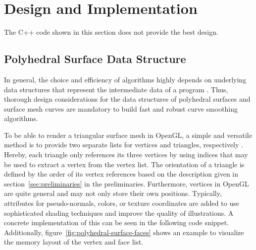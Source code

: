 \documentclass{stdlocal}
\begin{document}
\section{Design and Implementation} %
\label{sec:design}

The C++ code shown in this section does not provide the best design.

\subsection{Polyhedral Surface Data Structure} %
\label{sub:polyhedral_surface_data_structure}

  In general, the choice and efficiency of algorithms highly depends on underlying data structures that represent the intermediate data of a program \autocite{knuth1997,mehlhorn2008,smed2006}.
  Thus, thorough design considerations for the data structures of polyhedral surfaces and surface mesh curves are mandatory to build fast and robust curve smoothing algorithms.

  To be able to render a triangular surface mesh in OpenGL, a simple and versatile method is to provide two separate lists for vertices and triangles, respectively \autocite{opengl}.
  Hereby, each triangle only references its three vertices by using indices that may be used to extract a vertex from the vertex list.
  The orientation of a triangle is defined by the order of its vertex references based on the description given in section~\ref{sec:preliminaries} in the preliminaries.
  Furthermore, vertices in OpenGL are quite general and may not only store their own positions.
  Typically, attributes for pseudo-normals, colors, or texture coordinates are added to use sophisticated shading techniques and improve the quality of illustrations.
  A concrete implementation of this can be seen in the following code snippet.
  Additionally, figure~\ref{fig:polyhedral-surface-faces} shows an example to visualize the memory layout of the vertex and face list.
\end{document}
